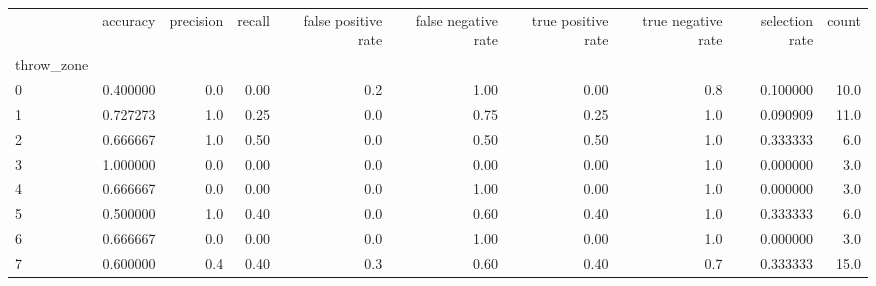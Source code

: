 \begin{tabular}{lrrrrrrrrr}
\toprule
{} &  accuracy &  precision &  recall &  false positive rate &  false negative rate &  true positive rate &  true negative rate &  selection rate &  count \\
throw\_zone &           &            &         &                      &                      &                     &                     &                 &        \\
\midrule
0          &  0.400000 &        0.0 &    0.00 &                  0.2 &                 1.00 &                0.00 &                 0.8 &        0.100000 &   10.0 \\
1          &  0.727273 &        1.0 &    0.25 &                  0.0 &                 0.75 &                0.25 &                 1.0 &        0.090909 &   11.0 \\
2          &  0.666667 &        1.0 &    0.50 &                  0.0 &                 0.50 &                0.50 &                 1.0 &        0.333333 &    6.0 \\
3          &  1.000000 &        0.0 &    0.00 &                  0.0 &                 0.00 &                0.00 &                 1.0 &        0.000000 &    3.0 \\
4          &  0.666667 &        0.0 &    0.00 &                  0.0 &                 1.00 &                0.00 &                 1.0 &        0.000000 &    3.0 \\
5          &  0.500000 &        1.0 &    0.40 &                  0.0 &                 0.60 &                0.40 &                 1.0 &        0.333333 &    6.0 \\
6          &  0.666667 &        0.0 &    0.00 &                  0.0 &                 1.00 &                0.00 &                 1.0 &        0.000000 &    3.0 \\
7          &  0.600000 &        0.4 &    0.40 &                  0.3 &                 0.60 &                0.40 &                 0.7 &        0.333333 &   15.0 \\
\bottomrule
\end{tabular}
